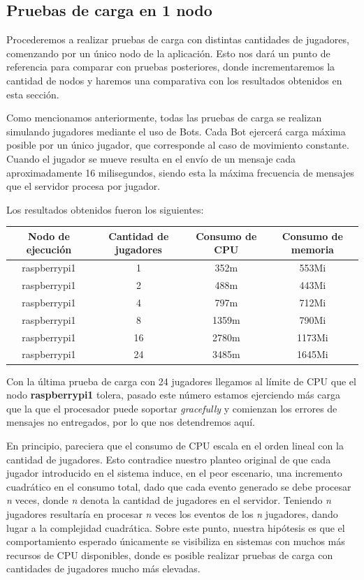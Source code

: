 \subsection{Pruebas de carga en 1 nodo}

\noindent Procederemos a realizar pruebas de carga con distintas cantidades de jugadores, comenzando por un único nodo de la aplicación. Esto
nos dará un punto de referencia para comparar con pruebas posteriores, donde incrementaremos la cantidad de nodos y haremos una comparativa con los resultados
obtenidos en esta sección.

Como mencionamos anteriormente, todas las pruebas de carga se realizan simulando jugadores mediante el uso de Bots. Cada Bot ejercerá carga máxima posible por un único jugador, que corresponde
al caso de movimiento constante. Cuando el jugador se mueve resulta en el envío de un mensaje cada aproximadamente 16 milisegundos, siendo esta la máxima frecuencia de mensajes que el servidor
procesa por jugador.

Los resultados obtenidos fueron los siguientes:

\begin{center}
\begin{tabular}{|c|c|c|c|}
    \hline
    \textbf{Nodo de ejecución} & \textbf{Cantidad de jugadores} & \textbf{Consumo de CPU} & \textbf{Consumo de memoria} \\
    \hline
    raspberrypi1 & 1 & 352m & 553Mi \\
    \hline
    raspberrypi1 & 2 & 488m & 443Mi \\
    \hline
    raspberrypi1 & 4 & 797m & 712Mi \\
    \hline
    raspberrypi1 & 8 & 1359m & 790Mi \\
    \hline
    raspberrypi1 & 16 & 2780m & 1173Mi \\
    \hline
    raspberrypi1 & 24 & 3485m & 1645Mi \\
    \hline
\end{tabular}
\end{center}


\noindent Con la última prueba de carga con 24 jugadores llegamos al límite de CPU que el nodo \textbf{raspberrypi1} tolera, pasado este número estamos ejerciendo más carga que la que el procesador
puede soportar \textit{gracefully} y comienzan los errores de mensajes no entregados, por lo que nos detendremos aquí. 

En principio, pareciera que el consumo de CPU escala en el orden lineal con la cantidad de jugadores. Esto contradice nuestro planteo original
de que cada jugador introducido en el sistema induce, en el peor escenario, una incremento cuadrático en el consumo total, dado que cada evento generado se debe procesar \textit{n} veces, donde \textit{n} denota la cantidad de jugadores en el servidor.
Teniendo \textit{n} jugadores resultaría en procesar \textit{n} veces los eventos de los \textit{n} jugadores, dando lugar a la complejidad cuadrática.
Sobre este punto, nuestra hipótesis es que el comportamiento esperado únicamente se visibiliza en sistemas con muchos más recursos de CPU disponibles, donde es posible realizar pruebas de carga
con cantidades de jugadores mucho más elevadas.

